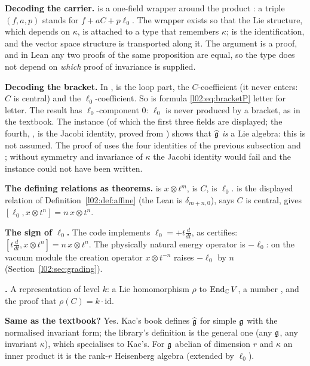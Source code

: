 \begin{dictionary}
\textbf{Decoding the carrier.}  is a one-field wrapper around the product
: a triple $(f,a,p)$ stands for $f + aC + p\ell_0$. The wrapper exists so
that the Lie structure, which depends on $\kappa$, is attached to a type that remembers $\kappa$;
 is the identification, and the vector space structure is transported along it. The
argument  is a proof, and in Lean any two proofs of the same proposition are equal, so
the type does not depend on \emph{which} proof of invariance is supplied.

\textbf{Decoding the bracket.} In ,  is the loop part,  the
$C$-coefficient (it never enters: $C$ is central) and  the $\ell_0$-coefficient. So
 is formula \eqref{l02:eq:bracketP} letter for letter. The result has $\ell_0$-component
$0$: $\ell_0$ is never produced by a bracket, as in the textbook. The  instance
(of which the first three fields are displayed; the fourth, , is the Jacobi
identity, proved from ) shows that $\widehat{\mathfrak{g}}$ \emph{is} a Lie algebra: this is
not assumed. The proof of  uses the four identities of the previous
subsection and ; without symmetry and invariance of $\kappa$ the Jacobi identity would fail
and the instance could not have been written.

\textbf{The defining relations as theorems.}  is $x\otimes t^m$, 
is $C$,  is $\ell_0$.  is the displayed relation of
Definition~\ref{l02:def:affine} (the Lean  is
$\delta_{m+n,0}$),  says $C$ is central,  gives
$[\ell_0,x\otimes t^n] = n\,x\otimes t^n$.

\textbf{The sign of $\ell_0$.} The code implements $\ell_0 = +t\frac{d}{dt}$, as 
certifies: $[t\frac{d}{dt}, x\otimes t^n] = n\,x\otimes t^n$. The physically natural energy operator is $-\ell_0$: on the vacuum module
the creation operator $x\otimes t^{-n}$ raises $-\ell_0$ by $n$ (Section~\ref{l02:sec:grading}).

\textbf{.} A representation of level $k$: a Lie homomorphism $\rho$ to
$\operatorname{End}_{\mathbb{C}} V$, a number , and the proof that $\rho(C) = k\cdot\mathrm{id}$.

\textbf{Same as the textbook?} Yes. Kac's book defines $\widehat{\mathfrak{g}}$ for simple $\mathfrak{g}$ with the
normalised invariant form; the library's definition is the general one (any $\mathfrak{g}$, any invariant
$\kappa$), which specialises to Kac's. For $\mathfrak{g}$ abelian of dimension $r$ and $\kappa$ an inner
product it is the rank-$r$ Heisenberg algebra (extended by $\ell_0$).
\end{dictionary}

